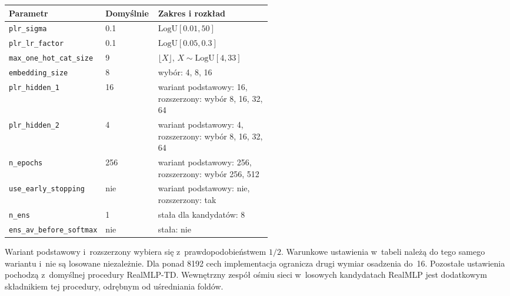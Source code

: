 \par\medskip\noindent\begin{minipage}{\linewidth}\captionsetup{hypcap=false}\centering\footnotesize
{}
\begin{tabularx}{\linewidth}{@{}P{0.32\linewidth}P{0.20\linewidth}Y@{}}
\toprule Parametr & Domyślnie & Zakres i rozkład \\
\midrule
\texttt{plr\_sigma} & 0.1 & $\mathrm{LogU}[0.01,50]$ \\
\texttt{plr\_lr\_factor} & 0.1 & $\mathrm{LogU}[0.05,0.3]$ \\
\texttt{max\_one\_hot\_cat\_size} & 9 & $\lfloor X\rfloor$, $X\sim\mathrm{LogU}[4,33]$ \\
\texttt{embedding\_size} & 8 & wybór: 4, 8, 16 \\
\texttt{plr\_hidden\_1} & 16 & wariant podstawowy: 16, rozszerzony: wybór 8, 16, 32, 64 \\
\texttt{plr\_hidden\_2} & 4 & wariant podstawowy: 4, rozszerzony: wybór 8, 16, 32, 64 \\
\texttt{n\_epochs} & 256 & wariant podstawowy: 256, rozszerzony: wybór 256, 512 \\
\texttt{use\_early\_stopping} & nie & wariant podstawowy: nie, rozszerzony: tak \\
\texttt{n\_ens} & 1 & stała dla kandydatów: 8 \\
\texttt{ens\_av\_before\_softmax} & nie & stała: nie \\
\bottomrule\end{tabularx}\end{minipage}\par\medskip

Wariant podstawowy i~rozszerzony wybiera się z~prawdopodobieństwem $1/2$. Warunkowe ustawienia w~tabeli należą do tego samego wariantu i~nie są losowane niezależnie. Dla ponad 8192 cech implementacja ogranicza drugi wymiar osadzenia do~16. Pozostałe ustawienia pochodzą z~domyślnej procedury RealMLP-TD. Wewnętrzny zespół ośmiu sieci w~losowych kandydatach RealMLP jest dodatkowym składnikiem tej procedury, odrębnym od uśredniania foldów.

